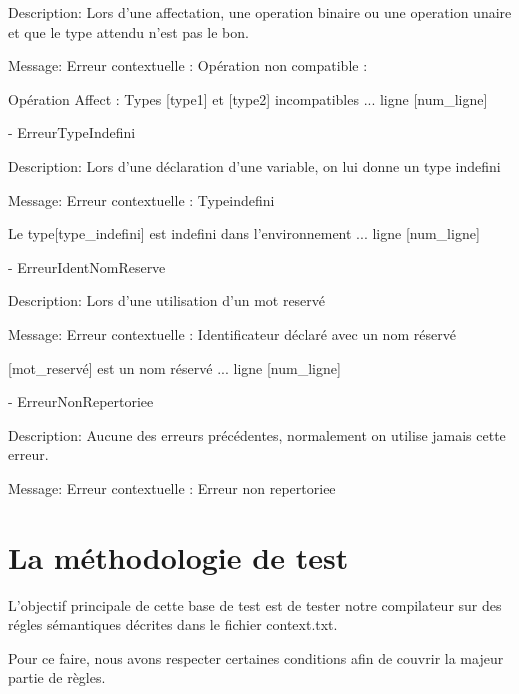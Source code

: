     Description: Lors d'une affectation, une operation binaire ou une operation unaire et que le type attendu n'est pas le bon.

    Message: Erreur contextuelle : Opération non compatible :

    Opération Affect : Types [type1] et [type2] incompatibles ... ligne [num\_ligne]

    \vspace{3mm}

    - ErreurTypeIndefini

    Description: Lors d'une déclaration d'une variable, on lui donne un type indefini

    Message: Erreur contextuelle : Typeindefini

    Le type[type\_indefini] est indefini dans l'environnement ... ligne [num\_ligne]

    \vspace{3mm}

    - ErreurIdentNomReserve

    Description: Lors d'une utilisation d'un mot reservé

    Message: Erreur contextuelle : Identificateur déclaré avec un nom réservé

    [mot\_reservé] est un nom réservé ... ligne [num\_ligne]

    \vspace{3mm}

    - ErreurNonRepertoriee

    Description: Aucune des erreurs précédentes, normalement on utilise jamais cette erreur.

    Message: Erreur contextuelle : Erreur non repertoriee

    \vspace{3mm}


\section*{La méthodologie de test}

    L'objectif principale de cette base de test est de tester notre compilateur
    sur des régles sémantiques décrites dans le fichier context.txt.

    \vspace{3mm}

    Pour ce faire, nous avons respecter certaines conditions afin de couvrir
    la majeur partie de règles.

    \vspace{3mm}

